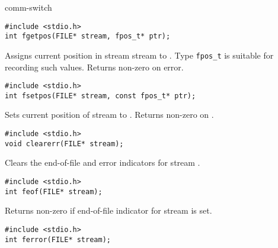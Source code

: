 \begin{Ventry2}{comm-switch  }
\item[fgetpos]
\label{item:fgetpos}
\begin{production}
\begin{verbatim}
#include <stdio.h>
int fgetpos(FILE* stream, fpos_t* ptr);
\end{verbatim}
\end{production}

     Assigns current position in stream stream to . Type \verb+fpos_t+ is suitable
     for recording such values. Returns non-zero on error.
\item[fsetpos]
\label{item:fsetpos}
\begin{production}
\begin{verbatim}
#include <stdio.h>
int fsetpos(FILE* stream, const fpos_t* ptr);
\end{verbatim}
\end{production}

     Sets current position of stream  to . Returns non-zero on .

\item[clearerr]
\label{item:clearerr}
\begin{production}
\begin{verbatim}
#include <stdio.h>
void clearerr(FILE* stream);
\end{verbatim}
\end{production}

     Clears the end-of-file and error indicators for stream .

\item[feof]
\label{item:feof}
\begin{production}
\begin{verbatim}
#include <stdio.h>
int feof(FILE* stream);
\end{verbatim}
\end{production}

     Returns non-zero if end-of-file indicator for stream  is set.

\item[ferror]
\label{item:ferror}
\begin{production}
\begin{verbatim}
#include <stdio.h>
int ferror(FILE* stream);
\end{verbatim}
\end{production}


\end{Ventry2}
